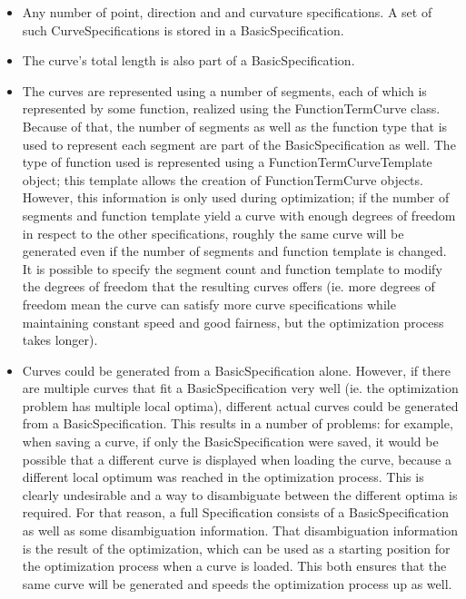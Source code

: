 \documentclass[a4paper]{article}
\begin{document}
				\begin{itemize}
					\item Any number of point, direction and and curvature specifications. A set of such CurveSpecifications is stored in a BasicSpecification.
					\item The curve's total length is also part of a BasicSpecification.
					\item The curves are represented using a number of segments, each of which is represented by some function, realized using the FunctionTermCurve class. Because of that, the number of segments as well as the function type that is used to represent each segment are part of the BasicSpecification as well. 
					The type of function used is represented using a FunctionTermCurveTemplate object; this template allows the creation of FunctionTermCurve objects.  
					However, this information is only used during optimization; if the number of segments and function template yield a curve with enough degrees of freedom in respect to the other specifications, roughly the same curve will be generated even if the number of segments and function template is changed. It is possible to specify the segment count and function template to modify the degrees of freedom that the resulting curves offers (ie. more degrees of freedom mean the curve can satisfy more curve specifications while maintaining constant speed and good fairness, but the optimization process takes longer).
					\item Curves could be generated from a BasicSpecification alone. However, if there are multiple curves that fit a BasicSpecification very well (ie. the optimization problem has multiple local optima), different actual curves could be generated from a BasicSpecification. This results in a number of problems: for example, when saving a curve, if only the BasicSpecification were saved, it would be possible that a different curve is displayed when loading the curve, because a different local optimum was reached in the optimization process. This is clearly undesirable and a way to disambiguate between the different optima is required. 
					For that reason, a full Specification consists of a BasicSpecification as well as some disambiguation information. That disambiguation information is the result of the optimization, which can be used as a starting position for the optimization process when a curve is loaded. This both ensures that the same curve will be generated and speeds the optimization process up as well.
				\end{itemize}
				
\end{document}
